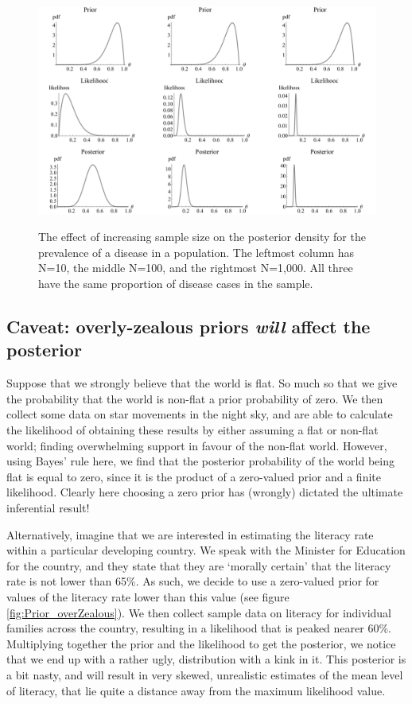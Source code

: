 \documentclass[11pt,fullpage]{book}
\begin{document}
\begin{figure}
\centering
\scalebox{0.40} 
{\includegraphics{Prior_weakPriorEffect.pdf}}\caption{The effect of increasing sample size on the posterior density for the prevalence of a disease in a population. The leftmost column has N=10, the middle N=100, and the rightmost N=1,000. All three have the same proportion of disease cases in the sample.}\label{fig:Prior_weakPriorEffect}
\end{figure}

\subsection{Caveat: overly-zealous priors \textit{will} affect the posterior}
Suppose that we strongly believe that the world is flat. So much so that we give the probability that the world is non-flat a prior probability of zero. We then collect some data on star movements in the night sky, and are able to calculate the likelihood of obtaining these results by either assuming a flat or non-flat world; finding overwhelming support in favour of the non-flat world. However, using Bayes' rule here, we find that the posterior probability of the world being flat is equal to zero, since it is the product of a zero-valued prior and a finite likelihood. Clearly here choosing a zero prior has (wrongly) dictated the ultimate inferential result!

Alternatively, imagine that we are interested in estimating the literacy rate within a particular developing country. We speak with the Minister for Education for the country, and they state that they are `morally certain' that the literacy rate is not lower than 65\%. As such, we decide to use a zero-valued prior for values of the literacy rate lower than this value (see figure \ref{fig:Prior_overZealous}). We then collect sample data on literacy for individual families across the country, resulting in a likelihood that is peaked nearer 60\%. Multiplying together the prior and the likelihood to get the posterior, we notice that we end up with a rather ugly, distribution with a kink in it. This posterior is a bit nasty, and will result in very skewed, unrealistic estimates of the mean level of literacy, that lie quite a distance away from the maximum likelihood value.
\end{document}
